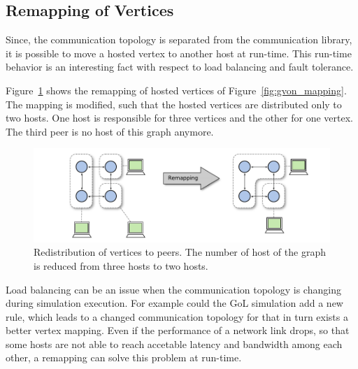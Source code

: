 \subsection{Remapping of Vertices}
\label{sec:remapping}
Since, the communication topology is separated from the communication
library, it is possible to move a hosted vertex to another host at
run-time.  This run-time behavior is an interesting fact with respect
to load balancing and fault tolerance.


Figure~\ref{fig:gvon_remapping} shows the remapping of
hosted vertices of Figure~\ref{fig:gvon_mapping}. The mapping is modified, such that the
hosted vertices are distributed only to two hosts. One host is responsible for three
vertices and the other for one vertex. The third peer is no host of this
graph anymore.

\begin{figure}[H]
  \centering
  \includegraphics[width=\textwidth]{graphics/30_gvon_remapping}
  \caption{Redistribution of vertices to peers. The number of host of
    the graph is reduced from three hosts to two hosts.}
  \label{fig:gvon_remapping}
\end{figure}

Load balancing can be an issue when the communication topology is
changing during simulation execution. For example could the GoL
simulation add a new rule, which leads to a changed communication
topology for that in turn exists a better vertex mapping.  Even if the
performance of a network link drops, so that some hosts are not able
to reach accetable latency and bandwidth among each other, a
remapping can solve this problem at run-time.

